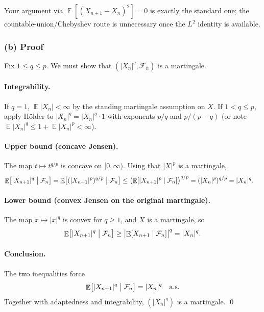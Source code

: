 \documentclass[11pt,a4paper]{article}
\DeclareMathOperator{\E}{\mathbb{E}}
\begin{document}
\begin{remark*}
Your argument via \(\E[(X_{n+1}-X_n)^2]=0\) is exactly the standard one; the countable-union/Chebyshev route is unnecessary once the \(L^2\) identity is available.
\end{remark*}

\subsubsection{(b) Proof}

Fix \(1\le q\le p\). We must show that \((|X_n|^q,\mathcal{F}_n)\) is a martingale.

\paragraph{Integrability.}
If \(q=1\), \(\E|X_n|<\infty\) by the standing martingale assumption on \(X\). If \(1<q\le p\), apply Hölder to \(|X_n|^q=|X_n|^q\cdot 1\) with exponents \(p/q\) and \(p/(p-q)\) (or note \(\E|X_n|^q\le 1+\E|X_n|^p<\infty\)).

\paragraph{Upper bound (concave Jensen).}
The map \(t\mapsto t^{q/p}\) is concave on \([0,\infty)\). Using that \(|X|^p\) is a martingale,
\begin{align*}
\E\bigl[|X_{n+1}|^q\bigm|\mathcal{F}_n\bigr]
&=
\E\bigl[(|X_{n+1}|^p)^{q/p}\bigm|\mathcal{F}_n\bigr]
\le
\bigl(\E[|X_{n+1}|^p\mid\mathcal{F}_n]\bigr)^{q/p}
=
(|X_n|^p)^{q/p}
=
|X_n|^q.
\end{align*}

\paragraph{Lower bound (convex Jensen on the original martingale).}
The map \(x\mapsto|x|^q\) is convex for \(q\ge 1\), and \(X\) is a martingale, so
\[
\E\bigl[|X_{n+1}|^q\bigm|\mathcal{F}_n\bigr]
\ge
\bigl|\E[X_{n+1}\mid\mathcal{F}_n]\bigr|^q
=
|X_n|^q.
\]

\paragraph{Conclusion.}
The two inequalities force
\[
\E\bigl[|X_{n+1}|^q\bigm|\mathcal{F}_n\bigr]
=
|X_n|^q
\quad\text{a.s.}
\]
Together with adaptedness and integrability, \((|X_n|^q)\) is a martingale.
\qed
\end{document}
